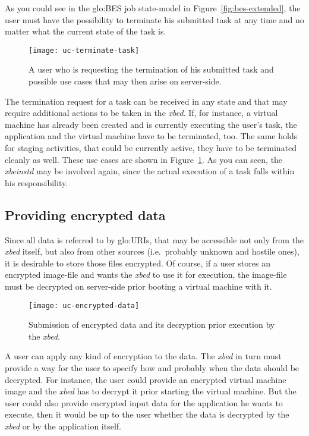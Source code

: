 As   you   could   see   in   the   \gls{glo:BES}   job   state-model   in
Figure~\ref{fig:bes-extended},  the  user  must  have the  possibility  to
terminate his  submitted task at any  time and no matter  what the current
state of the task is.

\begin{figure}[h!]
  \centering
  \texttt{[image: uc-terminate-task]}
  \caption[UC Terminate Task]{A user  who is requesting the termination of
    his  submitted task  and possible  use cases  that may  then  arise on
    server-side.}
  \label{fig:uc-terminate-task}
\end{figure}

The termination request  for a task can be received in  any state and that
may require  additional actions to be  taken in the  \emph{xbed}.  If, for
instance,  a virtual  machine has  already been  created and  is currently
executing the user's task, the application and the virtual machine have to
be terminated, too.  The same  holds for staging activities, that could be
currently active, they  have to be terminated cleanly  as well.  These use
cases are  shown in  Figure~\ref{fig:uc-terminate-task}. As you  can seen,
the \emph{xbeinstd} may be involved again, since the actual execution of a
task falls within his responsibility.

\subsection{Providing encrypted data}
\label{sec:uc-ecrypted-data}

Since all  data is referred to  by \gls{glo:URI}s, that  may be accessible
not  only  from  the  \emph{xbed}  itself, but  also  from  other  sources
(i.e.~probably unknown and  hostile ones), it is desirable  to store those
files encrypted. Of  course, if a user stores  an encrypted image-file and
wants  the \emph{xbed} to  use it  for execution,  the image-file  must be
decrypted on server-side prior booting a virtual machine with it.

\begin{figure}[h]
  \centering
  \texttt{[image: uc-encrypted-data]}
  \caption[UC  Encrypted  Data]{Submission   of  encrypted  data  and  its
    decryption prior execution by the \emph{xbed}.}
  \label{fig:uc-encrypt-data}
\end{figure}

A user  can apply any kind of  encryption to the data.  The \emph{xbed} in
turn must provide a way for the  user to specify how and probably when the
data  should  be decrypted.   For  instance,  the  user could  provide  an
encrypted  virtual machine  image and  the \emph{xbed}  has to  decrypt it
prior  starting the  virtual machine.   But  the user  could also  provide
encrypted  input data for  the application  he wants  to execute,  then it
would be up  to the user whether the data is  decrypted by the \emph{xbed}
or by the application itself.

